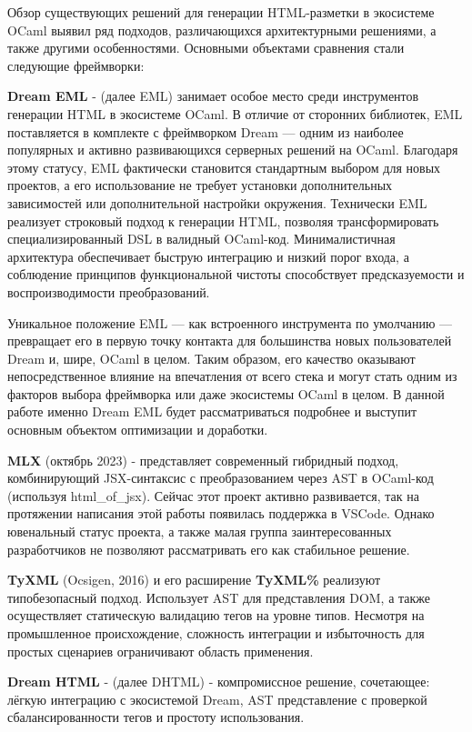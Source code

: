 Обзор существующих решений для генерации HTML-разметки в экосистеме OCaml выявил ряд подходов, различающихся архитектурными решениями, а также другими особенностями.
Основными объектами сравнения стали следующие фреймворки:

\textbf{Dream EML} - (далее EML) занимает особое место среди инструментов генерации HTML в экосистеме OCaml.
В отличие от сторонних библиотек, EML поставляется в комплекте с фреймворком Dream — одним из наиболее популярных и активно развивающихся серверных решений на OCaml.
Благодаря этому статусу, EML фактически становится стандартным выбором для новых проектов, а его использование не требует установки дополнительных зависимостей или дополнительной настройки окружения.
Технически EML реализует строковый подход к генерации HTML, позволяя трансформировать специализированный DSL в валидный OCaml-код.
Минималистичная архитектура обеспечивает быструю интеграцию и низкий порог входа, а соблюдение принципов функциональной чистоты способствует предсказуемости и воспроизводимости преобразований.

Уникальное положение EML — как встроенного инструмента по умолчанию — превращает его в первую точку контакта для большинства новых пользователей Dream и, шире, OCaml в целом.
Таким образом, его качество оказывают непосредственное влияние на впечатления от всего стека и могут стать одним из факторов выбора фреймворка или даже экосистемы OCaml в целом.
В данной работе именно Dream EML будет рассматриваться подробнее и выступит основным объектом оптимизации и доработки.

\textbf{MLX} (октябрь 2023) - представляет современный гибридный подход, комбинирующий JSX-синтаксис с преобразованием через AST в OCaml-код (используя html\_of\_jsx).
Сейчас этот проект активно развивается, так на протяжении написания этой работы появилась поддержка в VSCode.
Однако ювенальный статус проекта, а также малая группа заинтересованных разработчиков не позволяют рассматривать его как стабильное решение.

\textbf{TyXML} (Ocsigen, 2016) и его расширение \textbf{TyXML\%} реализуют типобезопасный подход.
Использует AST для представления DOM, а также осуществляет статическую валидацию тегов на уровне типов.
Несмотря на промышленное происхождение, сложность интеграции и избыточность для простых сценариев ограничивают область применения.

\textbf{Dream HTML} - (далее DHTML) - компромиссное решение, сочетающее: лёгкую интеграцию с экосистемой Dream, AST представление с проверкой сбалансированности тегов и простоту использования.

